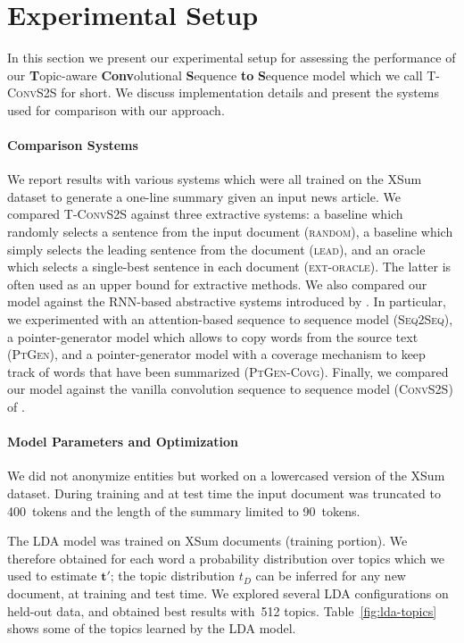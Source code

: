 \section{Experimental Setup}
\label{sec:setup}

In this section we present our experimental setup for assessing the
performance of our \textbf{T}opic-aware \textbf{Conv}olutional
\textbf{S}equence \textbf{to} \textbf{S}equence model which we call
\textsc{T-ConvS2S} for short.  We discuss implementation details and
present the systems used for comparison with our approach.



\paragraph{Comparison Systems} 
We report results with various systems which were all trained on the
XSum dataset to generate a one-line summary given an input news
article.  We compared \mbox{\textsc{T-ConvS2S}} against three
extractive systems: a baseline which randomly selects a sentence from
the input document (\textsc{random}), a baseline which simply selects
the leading sentence from the document (\textsc{lead}), and an oracle
which selects a single-best sentence in each document
(\textsc{ext-oracle}). The latter is often used as an upper bound for
extractive methods. We also compared our model against the RNN-based
abstractive systems introduced by . In particular,
we experimented with an attention-based sequence to sequence model
(\textsc{Seq2Seq}), a pointer-generator model which allows to copy
words from the source text (\textsc{PtGen}), and a pointer-generator
model with a coverage mechanism to keep track of words that have been
summarized (\textsc{PtGen-Covg}). Finally, we compared our model
against the vanilla convolution sequence to sequence model
(\textsc{ConvS2S}) of .



\paragraph{Model Parameters and Optimization} 

We did not anonymize entities but worked on a lowercased version of
the XSum dataset. During training and at test time the input document
was truncated to 400~tokens and  the length of the summary limited to
90~tokens.

The LDA model \cite{Blei:2003:LDA} was trained on XSum documents
(training portion). We therefore obtained for each word a probability
distribution over topics which we used to estimate $\mathbf{t'}$; the
topic distribution $t_D$ can be inferred for any new document, at
training and test time. We explored several LDA configurations on
held-out data, and obtained best results with~512
topics. Table~\ref{fig:lda-topics} shows some of the topics learned by
the LDA model.

